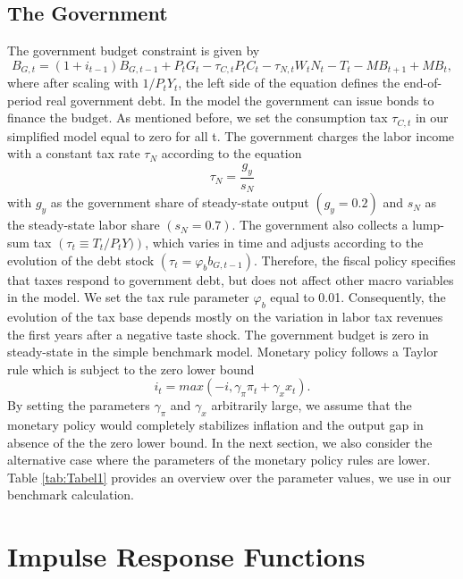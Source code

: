 \documentclass[12pt,a4paper,oneside,titlepage]{article}
\begin{document}
\subsection*{The Government}

The government budget constraint is given by
\begin{equation}
B_{G,t} = \left(1 + i_{t-1}\right)B_{G,t-1} + P_tG_t - \tau_{C,t}P_tC_t - \tau_{N,t}W_tN_t - T_t - MB_{t+1} + MB_t,  \nonumber
\end{equation}
where after scaling with $1/ P_tY_t$, the left side of the equation defines the end-of-period real government debt. In the model the government can issue bonds to finance the budget. As mentioned before, we set the consumption tax $\tau_{C,t}$ in our simplified model equal to zero for all t. The government charges the labor income with a constant tax rate $\tau_N$ according to the equation \[\tau_N = \frac{g_y}{s_N}\] with $g_y$ as the government share of steady-state output $\left(g_y = 0.2 \right)$ and $s_N$ as the steady-state labor share $\left(s_N = 0.7\right)$.
The government also collects a lump-sum tax $\left(\tau_t \equiv T_t/P_tY)\right)$, which varies in time and adjusts according to the evolution of the debt stock $\left(\tau_t = \varphi_b b_{G,t-1}\right)$. Therefore, the fiscal policy specifies that taxes respond to government debt, but does not affect other macro variables in the model. We set the tax rule parameter $\varphi_b$ equal to 0.01. Consequently, the evolution of the tax base depends mostly on the variation in labor tax revenues the first years after a negative taste shock. The government budget is zero in steady-state in the simple benchmark model.\newline
Monetary policy follows a Taylor rule which is subject to the zero lower bound
\begin{equation}
i_t = max \left(-i, \gamma_{\pi} \pi_t + \gamma_x x_t\right)  \nonumber.
\end{equation}
By setting the parameters $\gamma_{\pi}$ and $\gamma_x$ arbitrarily large, we assume that the monetary policy would completely stabilizes inflation and the output gap in absence of the the zero lower bound. In the next section, we also consider the alternative case where the parameters of the monetary policy rules are lower.\newline
Table \ref{tab:Tabel1} provides an overview over the parameter values, we use in our benchmark calculation.
\bigskip


\section{Impulse Response Functions}
\end{document}
